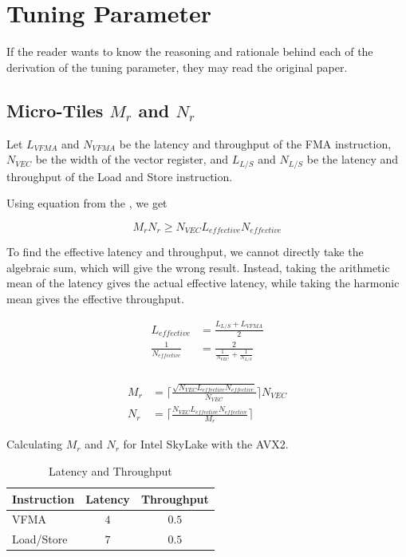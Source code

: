 \section{Tuning Parameter}

If the reader wants to know the reasoning and rationale 
behind each of the derivation of the tuning parameter, 
they may read the original \cite{BLIS} paper.

\subsection{Micro-Tiles $M_r$ and $N_r$}

Let $L_{VFMA}$ and $N_{VFMA}$ be the latency and throughput of the FMA instruction, 
$N_{VEC}$ be the width of the vector register, and
$L_{L/S}$ and $N_{L/S}$ be the latency and throughput of 
the Load and Store instruction.

Using equation from the \cite{BLIS}, we get

\begin{equation}
    M_rN_r \geq N_{VEC} L_{effective} N_{effective}
\end{equation}

To find the effective latency and throughput, we cannot directly take the 
algebraic sum, which will give the wrong result. Instead, taking the 
arithmetic mean of the latency gives the actual effective latency, 
while taking the harmonic mean gives the effective throughput.

\begin{align*}
    L_{effective} &= \frac{L_{L/S} + L_{VFMA}}{2}\\
    \frac{1}{N_{effective}} &= \frac{2}{ \frac{1}{N_{VEC}} + \frac{1}{N_{L/S}} } \\
\end{align*}

\begin{align*}
    M_r &= \lceil \frac{ \sqrt{N_{VEC} L_{effective} N_{effective}} }{N_{VEC}} \rceil N_{VEC} \\
    N_r &= \lceil \frac{ N_{VEC} L_{effective} N_{effective} }{M_r} \rceil
\end{align*}


Calculating $M_r$ and $N_r$ for Intel SkyLake with the AVX2.

\begin{table}[ht]
    \centering
    \caption{Latency and Throughput}
    \begin{tabular}{|l|c|c|}
        \hline
        \textbf{Instruction} & \textbf{Latency} & \textbf{Throughput}\\
        \hline
        VFMA        & $4$ & $0.5$ \\
        \hline
        Load/Store  & $7$ & $0.5$ \\
        \hline
    \end{tabular}
\end{table}

